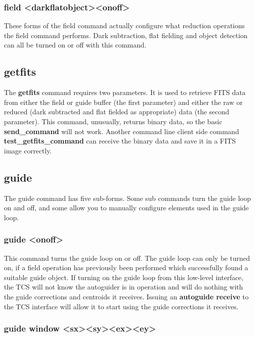 \documentclass[10pt,a4paper]{article}
\begin{document}
\subsubsection{field \textless dark\textbar flat\textbar object\textgreater  \textless on\textbar off\textgreater}

These forms of the field command actually configure what reduction operations the field command performs. Dark subtraction, flat fielding and object detection can all be turned on or off with this command.

\subsection{getfits}

The {\bf getfits} command requires two parameters. It is used to retrieve FITS data from either the field or guide buffer (the first parameter) and either the raw or reduced (dark subtracted and flat fielded as appropriate) data (the second parameter). This command, unusually, returns binary data, so the basic {\bf send\_command} will not work. Another command line client side command {\bf test\_getfits\_command} can receive the binary data and save it in a FITS image correctly.

\subsection{guide}

The guide command has five sub-forms. Some sub commands turn the guide loop on and off, and some allow you to manually configure elements used in the guide loop.

\subsubsection{guide \textless on\textbar off\textgreater}

This command turns the guide loop on or off. The guide loop can only be turned on, if a field operation has previously been performed which successfully found a suitable guide object. If turning on the guide loop from this low-level interface, the TCS will not know the autoguider is in operation and will do nothing with the guide corrections and centroids it receives. Issuing an {\bf autoguide receive} to the TCS interface will allow it to start using the guide corrections it receives.

\subsubsection{guide window \textless sx\textgreater  \textless sy\textgreater  \textless ex\textgreater  \textless ey\textgreater}
\end{document}
